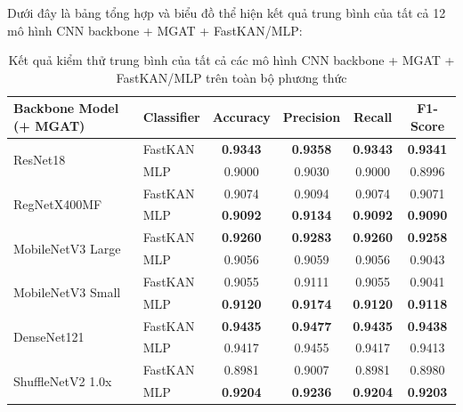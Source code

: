 Dưới đây là bảng tổng hợp và biểu đồ thể hiện kết quả trung bình của tất cả 12 mô hình CNN backbone + MGAT + FastKAN/MLP:
\begin{table}[H]
\centering
\renewcommand{\arraystretch}{1.2}
\setlength{\tabcolsep}{6pt}
\caption{\centering Kết quả kiểm thử trung bình của tất cả các mô hình CNN backbone + MGAT + FastKAN/MLP trên toàn bộ phương thức}
\begin{tabular}{llcccc}
\hline
\textbf{Backbone Model (+ MGAT)} & \textbf{Classifier} & \textbf{Accuracy} & \textbf{Precision} & \textbf{Recall} & \textbf{F1-Score} \\ 
\hline

\multirow{2}{*}{ResNet18} 
& FastKAN & \textbf{0.9343} & \textbf{0.9358} & \textbf{0.9343} & \textbf{0.9341} \\
& MLP & 0.9000 & 0.9030 & 0.9000 & 0.8996 \\ 
\hline

\multirow{2}{*}{RegNetX400MF} 
& FastKAN & 0.9074 & 0.9094 & 0.9074 & 0.9071 \\
& MLP & \textbf{0.9092} & \textbf{0.9134} & \textbf{0.9092} & \textbf{0.9090} \\ 
\hline

\multirow{2}{*}{MobileNetV3 Large} 
& FastKAN & \textbf{0.9260} & \textbf{0.9283} & \textbf{0.9260} & \textbf{0.9258} \\
& MLP & 0.9056 & 0.9059 & 0.9056 & 0.9043 \\ 
\hline

\multirow{2}{*}{MobileNetV3 Small} 
& FastKAN & 0.9055 & 0.9111 & 0.9055 & 0.9041 \\
& MLP & \textbf{0.9120} & \textbf{0.9174} & \textbf{0.9120} & \textbf{0.9118} \\ 
\hline

\multirow{2}{*}{DenseNet121} 
& FastKAN & \textbf{0.9435} & \textbf{0.9477} & \textbf{0.9435} & \textbf{0.9438} \\
& MLP & 0.9417 & 0.9455 & 0.9417 & 0.9413 \\ 
\hline

\multirow{2}{*}{ShuffleNetV2 1.0x} 
& FastKAN & 0.8981 & 0.9007 & 0.8981 & 0.8980 \\
& MLP & \textbf{0.9204} & \textbf{0.9236} & \textbf{0.9204} & \textbf{0.9203} \\ 
\hline

\end{tabular}
\label{tab:avg_performance_comparison}
\end{table}

